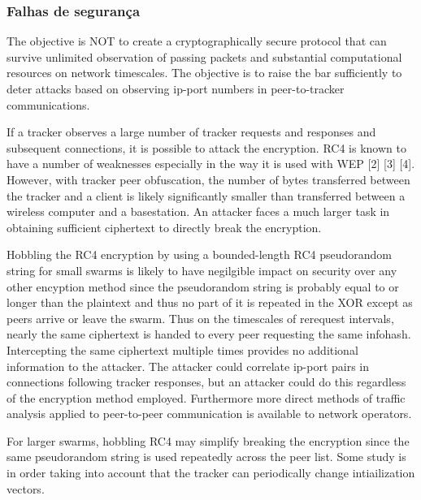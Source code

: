 
\subsubsection*{Falhas de segurança}

The objective is NOT to create a cryptographically secure protocol that can survive unlimited observation of passing packets and substantial computational resources on network timescales. The objective is to raise the bar sufficiently to deter attacks based on observing ip-port numbers in peer-to-tracker communications.

If a tracker observes a large number of tracker requests and responses and subsequent connections, it is possible to attack the encryption. RC4 is known to have a number of weaknesses especially in the way it is used with WEP [2] [3] [4]. However, with tracker peer obfuscation, the number of bytes transferred between the tracker and a client is likely significantly smaller than transferred between a wireless computer and a basestation. An attacker faces a much larger task in obtaining sufficient ciphertext to directly break the encryption.

Hobbling the RC4 encryption by using a bounded-length RC4 pseudorandom string for small swarms is likely to have negilgible impact on security over any other encyption method since the pseudorandom string is probably equal to or longer than the plaintext and thus no part of it is repeated in the XOR except as peers arrive or leave the swarm. Thus on the timescales of rerequest intervals, nearly the same ciphertext is handed to every peer requesting the same infohash. Intercepting the same ciphertext multiple times provides no additional information to the attacker. The attacker could correlate ip-port pairs in connections following tracker responses, but an attacker could do this regardless of the encryption method employed. Furthermore more direct methods of traffic analysis applied to peer-to-peer communication is available to network operators.

For larger swarms, hobbling RC4 may simplify breaking the encryption since the same pseudorandom string is used repeatedly across the peer list. Some study is in order taking into account that the tracker can periodically change intiailization vectors.